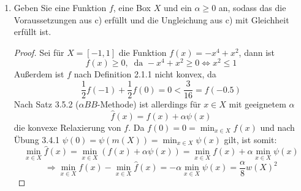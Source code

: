 \documentclass[12pt]{extreport} %
\begin{document}
\begin{enumerate}
		$$ v - \hat{v} \leq \frac{\alpha}{8} w(X)^2 $$
		\begin{proof}
			Da die Voraussetzungen von a) und b) gelten und nach Übung 3.4.1 
			$$ \psi(x) \geq \min_{x \in X} \psi(x) = -\frac{1}{8} w(X)^2, $$
			folgt die Behauptung aus b), indem man 
			$$ g(x) \coloneqq \alpha \psi(x) \quad \forall x \in X $$
			setzt, damit nicht $g(x) \geq -2$ sondern $g(x) \geq \alpha \min_{x \in X} \psi(x) = - \frac{\alpha}{8} w(X)^2$, und da nach Satz 3.4.3 folgt, dass $\hat{f} = f + \psi$ eine konvexe Relaxierung von $f$ auf $X$ ist.
		\end{proof}
	\item Geben Sie eine Funktion $f$, eine Box $X$ und ein $\alpha \geq 0$ an, sodass das die Voraussetzungen aus c) erfüllt und die Ungleichung aus c) mit Gleichheit erfüllt ist.
		\begin{proof}
			Sei für $X = [-1, 1]$ die Funktion $f(x) = - x^4 +  x^2$, dann ist 
			$$ f(x) \geq 0, ~\text{ da } - x^4 +  x^2 \geq 0 \iff x^2 \leq 1 $$
			Außerdem ist $f$ nach Definition 2.1.1 nicht konvex, da 
			$$ \frac{1}{2} f(-1) + \frac{1}{2} f(0) = 0 < \frac{3}{16} = f(-0.5) $$
			Nach Satz 3.5.2 ($\alpha BB$-Methode) ist allerdings für $x \in X$ mit geeignetem $\alpha$
			$$ \hat{f}(x) = f(x) + \alpha \psi(x) $$
		 die konvexe Relaxierung von $f$. Da $f(0) = 0 = \min_{x \in X} f(x)$ und nach Übung 3.4.1 $\psi(0) = \psi(m(X)) = \min_{x \in X} \psi(x)$ gilt, ist somit:
			$$ \min_{x \in X} \hat{f}(x) = \min_{x \in X} \left( f(x) + \alpha \psi(x) \right) = \min_{x \in X} f(x) + \alpha \min_{x \in X} \psi(x)  $$
			$$ \Rightarrow \min_{x \in X} f(x) - \min_{x \in X} \hat{f}(x) = - \alpha \min_{x \in X} \psi(x) =  \frac{\alpha}{8} w(X)^2  $$
		\end{proof}
\end{enumerate}
\end{document}
